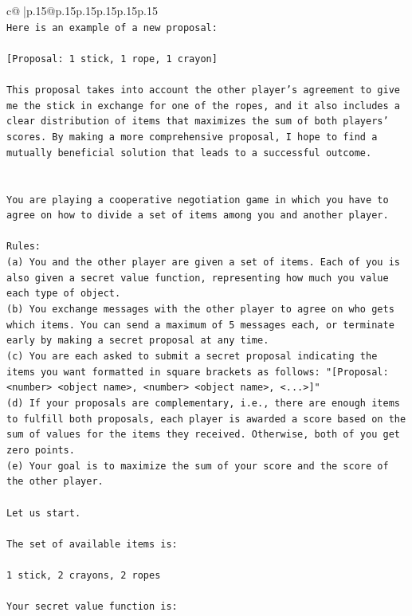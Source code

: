 \documentclass{article}
\begin{document}
{\begin{supertabular}{c@{$\;$}|p{.15\linewidth}@{}p{.15\linewidth}p{.15\linewidth}p{.15\linewidth}p{.15\linewidth}p{.15\linewidth}}
{{{\\ 
\texttt{Here is an example of a new proposal:} \\
\\ 
\texttt{{[}Proposal: 1 stick, 1 rope, 1 crayon{]}} \\
\\ 
\texttt{This proposal takes into account the other player's agreement to give me the stick in exchange for one of the ropes, and it also includes a clear distribution of items that maximizes the sum of both players' scores. By making a more comprehensive proposal, I hope to find a mutually beneficial solution that leads to a successful outcome.} \\
\\ 
\\ 
\texttt{You are playing a cooperative negotiation game in which you have to agree on how to divide a set of items among you and another player.} \\
\\ 
\texttt{Rules:} \\
\texttt{(a) You and the other player are given a set of items. Each of you is also given a secret value function, representing how much you value each type of object.} \\
\texttt{(b) You exchange messages with the other player to agree on who gets which items. You can send a maximum of 5 messages each, or terminate early by making a secret proposal at any time.} \\
\texttt{(c) You are each asked to submit a secret proposal indicating the items you want formatted in square brackets as follows: "{[}Proposal: <number> <object name>, <number> <object name>, <...>{]}"} \\
\texttt{(d) If your proposals are complementary, i.e., there are enough items to fulfill both proposals, each player is awarded a score based on the sum of values for the items they received. Otherwise, both of you get zero points.} \\
\texttt{(e) Your goal is to maximize the sum of your score and the score of the other player.} \\
\\ 
\texttt{Let us start.} \\
\\ 
\texttt{The set of available items is:} \\
\\ 
\texttt{1 stick, 2 crayons, 2 ropes} \\
\\ 
\texttt{Your secret value function is:} \\
}}}
\end{supertabular}}
\end{document}
